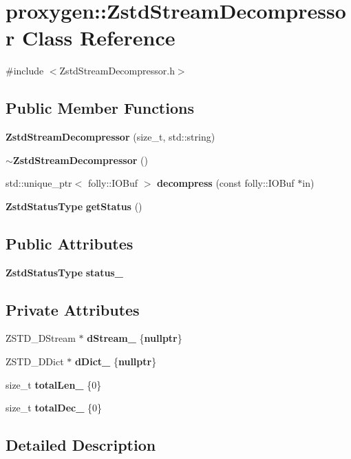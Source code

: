 \section{proxygen\+:\+:Zstd\+Stream\+Decompressor Class Reference}
\label{classproxygen_1_1ZstdStreamDecompressor}


{\ttfamily \#include $<$Zstd\+Stream\+Decompressor.\+h$>$}

\subsection*{Public Member Functions}
\begin{DoxyCompactItemize}
\item 
{\bf Zstd\+Stream\+Decompressor} (size\+\_\+t, std\+::string)
\item 
{\bf $\sim$\+Zstd\+Stream\+Decompressor} ()
\item 
std\+::unique\+\_\+ptr$<$ folly\+::\+I\+O\+Buf $>$ {\bf decompress} (const folly\+::\+I\+O\+Buf $\ast$in)
\item 
{\bf Zstd\+Status\+Type} {\bf get\+Status} ()
\end{DoxyCompactItemize}
\subsection*{Public Attributes}
\begin{DoxyCompactItemize}
\item 
{\bf Zstd\+Status\+Type} {\bf status\+\_\+}
\end{DoxyCompactItemize}
\subsection*{Private Attributes}
\begin{DoxyCompactItemize}
\item 
Z\+S\+T\+D\+\_\+\+D\+Stream $\ast$ {\bf d\+Stream\+\_\+} \{{\bf nullptr}\}
\item 
Z\+S\+T\+D\+\_\+\+D\+Dict $\ast$ {\bf d\+Dict\+\_\+} \{{\bf nullptr}\}
\item 
size\+\_\+t {\bf total\+Len\+\_\+} \{0\}
\item 
size\+\_\+t {\bf total\+Dec\+\_\+} \{0\}
\end{DoxyCompactItemize}


\subsection{Detailed Description}


